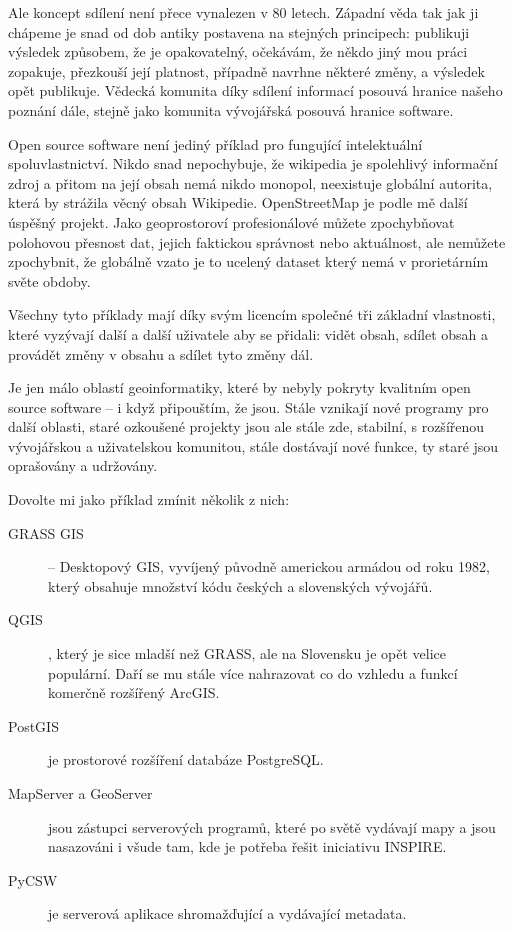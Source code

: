 \documentclass[twoside]{oss-conf}
\begin{document}
Ale koncept sdílení není přece vynalezen v 80 letech. Západní věda tak jak ji
chápeme je snad od dob antiky postavena na stejných principech: publikuji
výsledek způsobem, že je opakovatelný, očekávám, že někdo jiný mou práci
zopakuje, přezkouší její platnost, případně navrhne některé změny, a výsledek
opět publikuje. Vědecká komunita díky sdílení informací posouvá hranice našeho
poznání dále, stejně jako komunita vývojářská posouvá hranice software.

Open source software není jediný příklad pro fungující intelektuální
spoluvlastnictví. Nikdo snad nepochybuje, že wikipedia je spolehlivý informační
zdroj a přitom na její obsah nemá nikdo monopol, neexistuje globální autorita,
která by strážila věcný obsah Wikipedie. OpenStreetMap je podle mě další
úspěšný projekt. Jako geoprostoroví profesionálové můžete zpochybňovat polohovou
přesnost dat, jejich faktickou správnost nebo aktuálnost, ale nemůžete
zpochybnit, že globálně vzato je to ucelený dataset který nemá v prorietárním
světe obdoby.

Všechny tyto příklady mají díky svým licencím společné tři základní vlastnosti,
které vyzývají další a další uživatele aby se přidali: vidět obsah, sdílet obsah
a provádět změny v obsahu a sdílet tyto změny dál.

Je jen málo oblastí geoinformatiky, které by nebyly pokryty kvalitním open
source software -- i když připouštím, že jsou. Stále vznikají nové programy pro
další oblasti, staré ozkoušené projekty jsou ale stále zde, stabilní, s
rozšířenou vývojářskou a uživatelskou komunitou, stále dostávají nové funkce, ty
staré jsou oprašovány a udržovány.

Dovolte mi jako příklad zmínit několik z nich:
\begin{description}
    \item[GRASS GIS] -- Desktopový GIS, vyvíjený původně americkou armádou od roku 1982,
který obsahuje množství kódu českých a slovenských vývojářů.

\item[QGIS], který je sice mladší než GRASS, ale na Slovensku je opět velice populární.
Daří se mu stále více nahrazovat co do vzhledu a funkcí komerčně rozšířený
ArcGIS.

\item[PostGIS] je prostorové rozšíření databáze PostgreSQL.

    \item[MapServer a GeoServer] jsou zástupci serverových programů, které po světě
vydávají mapy a jsou nasazováni i všude tam, kde je potřeba řešit iniciativu
INSPIRE.

\item[PyCSW] je serverová aplikace shromažďující a vydávající metadata.
\end{description}
\end{document}
